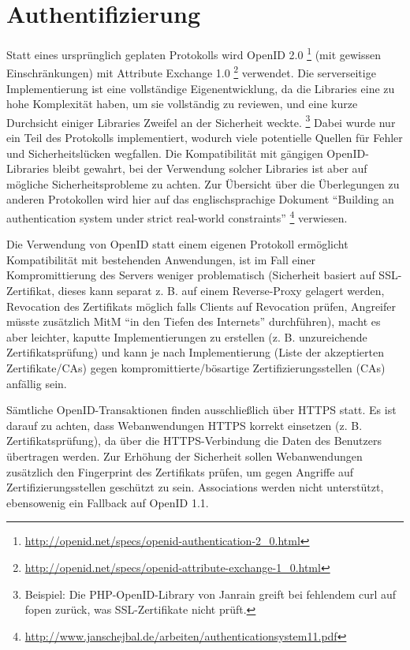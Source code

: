 \documentclass[parskip=half]{scrartcl}
\begin{document}
\section{Authentifizierung}
Statt eines ursprünglich geplaten Protokolls wird OpenID 2.0 \footnote{\url{http://openid.net/specs/openid-authentication-2_0.html}} (mit gewissen Einschränkungen)
mit Attribute Exchange 1.0 \footnote{\url{http://openid.net/specs/openid-attribute-exchange-1_0.html}} verwendet.
Die serverseitige Implementierung ist eine vollständige Eigenentwicklung, da die Libraries eine zu hohe Komplexität haben, um sie vollständig zu reviewen,
und eine kurze Durchsicht einiger Libraries Zweifel an der Sicherheit weckte.
\footnote{Beispiel: Die PHP-OpenID-Library von Janrain greift bei fehlendem curl auf fopen zurück, was SSL-Zertifikate nicht prüft.}
Dabei wurde nur ein Teil des Protokolls implementiert, wodurch viele potentielle Quellen für Fehler und Sicherheitslücken wegfallen.
Die Kompatibilität mit gängigen OpenID-Libraries bleibt gewahrt, bei der Verwendung solcher Libraries ist aber auf mögliche Sicherheitsprobleme zu achten.
Zur Übersicht über die Überlegungen zu anderen Protokollen wird hier auf das englischsprachige Dokument
"`Building an authentication system under strict real-world constraints"'
\footnote{\url{http://www.janschejbal.de/arbeiten/authenticationsystem11.pdf}} verwiesen.

Die Verwendung von OpenID statt einem eigenen Protokoll ermöglicht Kompatibilität mit bestehenden Anwendungen,
ist im Fall einer Kompromittierung des Servers weniger problematisch
(Sicherheit basiert auf SSL-Zertifikat, dieses kann separat z. B. auf einem Reverse-Proxy gelagert werden,
Revocation des Zertifikats möglich falls Clients auf Revocation prüfen, Angreifer müsste zusätzlich MitM "`in den Tiefen des Internets"' durchführen), 
macht es aber leichter, kaputte Implementierungen zu erstellen (z. B. unzureichende Zertifikatsprüfung)
und kann je nach Implementierung (Liste der akzeptierten Zertifikate/CAs) gegen kompromittierte/bösartige Zertifizierungsstellen (CAs) anfällig sein.

Sämtliche OpenID-Transaktionen finden ausschließlich über HTTPS statt.
Es ist darauf zu achten, dass Webanwendungen HTTPS korrekt einsetzen (z. B. Zertifikatsprüfung), da über die HTTPS-Verbindung die Daten des Benutzers übertragen werden.
Zur Erhöhung der Sicherheit sollen Webanwendungen zusätzlich den Fingerprint des Zertifikats prüfen, um gegen Angriffe auf Zertifizierungsstellen geschützt zu sein.
Associations werden nicht unterstützt, ebensowenig ein Fallback auf OpenID 1.1.
\end{document}
